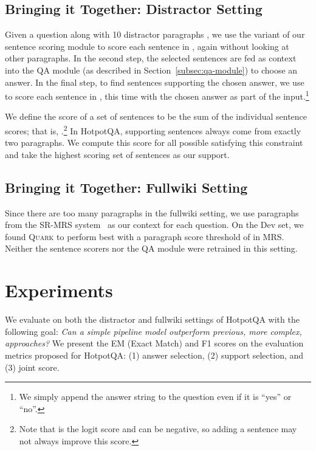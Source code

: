 \documentclass[11pt,a4paper]{article}
\newcommand\model{\textsc{Quark}\xspace}
\newcommand{\hpqa}{HotpotQA\xspace}
\begin{document}
\subsection{Bringing it Together: Distractor Setting}
\label{subsec:distractor-setting}

Given a question along with 10 distractor paragraphs , we use the  variant of our sentence scoring module to score each sentence  in , again without looking at other paragraphs. In the second step, the selected sentences are fed as context  into the QA module (as described in Section~\ref{subsec:qa-module}) to choose an answer. In the final step, to find sentences supporting the chosen answer, we use  to score each sentence in , this time with the chosen answer as part of the input.\footnote{We simply append the answer string to the question even if it is ``yes'' or ``no''.}

We define the score  of a set of sentences  to be the sum of the individual sentence scores; that is, .\footnote{Note that  is the logit score and can be negative, so adding a sentence may not always improve this score.} In \hpqa, supporting sentences always come from exactly two paragraphs. We compute this score for all possible  satisfying this constraint and take the highest scoring set of sentences as our support.

\subsection{Bringing it Together: Fullwiki Setting}
\label{subsec:fullwiki-setting}

Since there are too many paragraphs in the fullwiki setting, we use paragraphs from the SR-MRS system~\cite{semanticmrs} as our context  for each question. On the Dev set, we found \model to perform best with a paragraph score threshold of  in MRS. Neither the sentence scorers  nor the QA module were retrained in this setting.

\section{Experiments}

We evaluate on both the distractor and fullwiki settings of \hpqa with the following goal: \emph{Can a simple pipeline model outperform previous, more complex, approaches?} We present the EM (Exact Match) and F1 scores on the evaluation metrics proposed for \hpqa: (1) answer selection, (2) support selection, and (3) joint score. 
\end{document}
